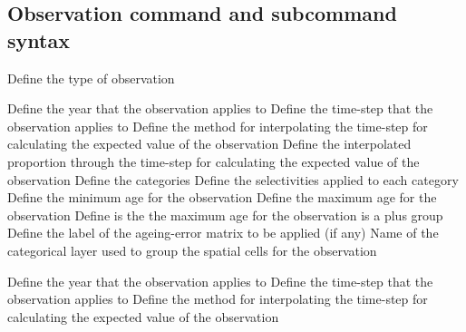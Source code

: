 \subsection{Observation command and subcommand syntax}\par
{}\par\par
{} {Define the type of observation}
\par\textbf{}\par
{} {Define the year that the observation applies to}
 {Define the time-step that the observation applies to}
 {Define the method for interpolating the time-step for calculating the expected value of the observation}
 {Define the interpolated proportion through the time-step for calculating the expected value of the observation}
 {Define the categories}
 {Define the selectivities applied to each category}
 {Define the minimum age for the observation}
 {Define the maximum age for the observation}
 {Define is the the maximum age for the observation is a plus group}
 {Define the label of the ageing-error matrix to be applied (if any)}
 {Name of the categorical layer used to group the spatial cells for the observation}
\par\textbf{}\par
{} {Define the year that the observation applies to}
 {Define the time-step that the observation applies to}
 {Define the method for interpolating the time-step for calculating the expected value of the observation}
